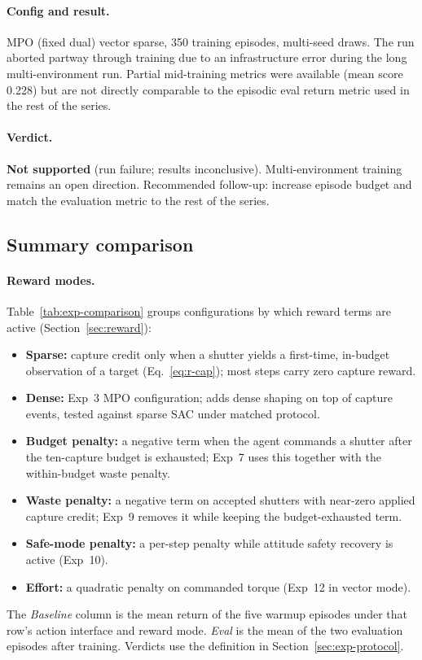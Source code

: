 \paragraph{Config and result.}
MPO (fixed dual) vector sparse, 350 training episodes, multi-seed draws.
The run aborted partway through training due to an infrastructure error during the long multi-environment run.
Partial mid-training metrics were available (mean score 0.228) but are not directly comparable
to the episodic eval return metric used in the rest of the series.

\paragraph{Verdict.}
\textbf{Not supported} (run failure; results inconclusive).
Multi-environment training remains an open direction.
Recommended follow-up: increase episode budget and match the evaluation
metric to the rest of the series.

\subsection{Summary comparison}
\label{sec:exp-table}

\paragraph{Reward modes.}
Table~\ref{tab:exp-comparison} groups configurations by which reward terms are active (Section~\ref{sec:reward}):
\begin{itemize}
  \item \textbf{Sparse:} capture credit only when a shutter yields a first-time, in-budget observation of a target (Eq.~\ref{eq:r-cap}); most steps carry zero capture reward.
  \item \textbf{Dense:} Exp~3 MPO configuration; adds dense shaping on top of capture events, tested against sparse SAC under matched protocol.
  \item \textbf{Budget penalty:} a negative term when the agent commands a shutter after the ten-capture budget is exhausted; Exp~7 uses this together with the within-budget waste penalty.
  \item \textbf{Waste penalty:} a negative term on accepted shutters with near-zero applied capture credit; Exp~9 removes it while keeping the budget-exhausted term.
  \item \textbf{Safe-mode penalty:} a per-step penalty while attitude safety recovery is active (Exp~10).
  \item \textbf{Effort:} a quadratic penalty on commanded torque (Exp~12 in vector mode).
\end{itemize}
The \emph{Baseline} column is the mean return of the five warmup episodes under that row's action interface and reward mode.
\emph{Eval} is the mean of the two evaluation episodes after training.
Verdicts use the definition in Section~\ref{sec:exp-protocol}.

